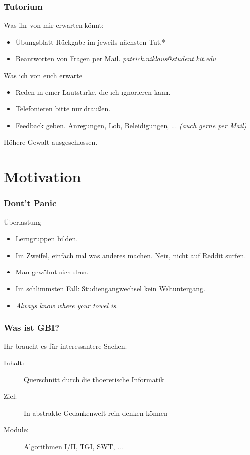 \documentclass{beamer}
\begin{document}
\begin{frame}
  \frametitle{Tutorium}
  \begin{block}{Was ihr von mir erwarten könnt:}
    \begin{itemize}
      \item Übungsblatt-Rückgabe im jeweils nächsten Tut.*
      \item Beantworten von Fragen per Mail. {\small \emph{patrick.niklaus@student.kit.edu}}
    \end{itemize}
  \end{block}
    \begin{block}{Was ich von euch erwarte:}
    \begin{itemize}
      \item Reden in einer Lautstärke, die ich ignorieren kann.
      \item Telefonieren bitte nur draußen.
      \item Feedback geben. Anregungen, Lob, Beleidigungen, ... \emph{(auch gerne per Mail)}
    \end{itemize}
  \end{block}
  \footnotesize *Höhere Gewalt ausgeschlossen.
\end{frame}

\section{Motivation}
\begin{frame}
  \frametitle{Dont't Panic}
  \begin{block}{Überlastung}
    \begin{itemize}
      \item Lerngruppen bilden.
      \item Im Zweifel, einfach mal was anderes machen. {\tiny Nein, nicht auf Reddit surfen.}
      \item Man gewöhnt sich dran.
      \item Im schlimmsten Fall: Studiengangwechsel kein Weltuntergang.
      \item\textit{Always know where your towel is.}
    \end{itemize}
  \end{block}
\end{frame}
\begin{frame}
  \frametitle{Was ist GBI?}
  \begin{block}{Ihr braucht es für interessantere Sachen.}
    \begin{description}
      \item[Inhalt:] Querschnitt durch die thoeretische Informatik
      \item[Ziel:] In abstrakte Gedankenwelt rein denken können
      \item[Module:] Algorithmen I/II, TGI, SWT, ...
    \end{description}
  \end{block}
\end{frame}
\end{document}
